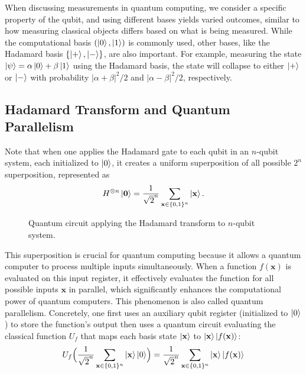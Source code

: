 \documentclass[cryptography,review,submit,pdftex,moreauthors,amsmath,amssymb,aps,strict]{Definitions/mdpi}
\begin{document}
When discussing measurements in quantum computing, we consider a specific property of the qubit, and using different bases yields varied outcomes, similar to how measuring classical objects differs based on what is being measured. While the computational basis $(\ket{0},\ket{1})$ is commonly used, other bases, like the Hadamard basis $\{\ket{+},\ket{-}\}$, are also important. For example, measuring the state $\ket{\psi}=\alpha\ket{0}+\beta\ket{1}$ using the Hadamard basis, the state will collapse to either $\ket{+}$ or $\ket{-}$ with probability $|\alpha+\beta|^2/2$ and $|\alpha-\beta|^2/2$, respectively. 

\subsection{Hadamard Transform and Quantum Parallelism}
Note that when one applies the Hadamard gate to each qubit in an $n$-qubit system, each initialized to $\ket{0}$, it creates a uniform superposition of all possible  $2^n$ superposition, represented as  
\begin{align}
    H^{\otimes n}\ket{\mathbf{0}}=\frac{1}{\sqrt{2}^n}\sum_{\mathbf{x}\in\{0,1\}^n}\ket{\mathbf{x}}.
\end{align}

\begin{figure}[h]
    \center
    
    \caption{Quantum circuit applying the Hadamard transform to $n$-qubit system.}
    \label{fig:fig:hadamard-transform}
\end{figure}

This superposition is crucial for quantum computing because it allows a quantum computer to process multiple inputs simultaneously. When a function $f(\mathbf{x})$ is evaluated on this input register, it effectively evaluates the function for all possible inputs $\mathbf{x}$ in parallel, which significantly enhances the computational power of quantum computers. This phenomenon is also called quantum parallelism. Concretely, one first uses an auxiliary qubit register (initialized to $\ket{0}$) to store the function's output then uses a quantum circuit evaluating the classical function $U_f$ that maps each basis state $\ket{\mathbf{x}}$ to $\ket{\mathbf{x}}\ket{f(\mathbf{x})}$:
\begin{align}
U_f\Bigl(\frac{1}{\sqrt{2}^n}\sum_{\mathbf{x}\in\{0,1\}^n}\ket{\mathbf{x}}\ket{0}\Bigr) = \frac{1}{\sqrt{2}^n}\sum_{\mathbf{x}\in\{0,1\}^n}\ket{\mathbf{x}}\ket{f(\mathbf{x})}
\end{align}
\end{document}
